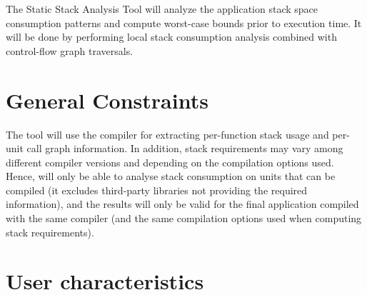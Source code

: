 The Static Stack Analysis Tool will analyze the application stack
space consumption patterns and compute worst-case bounds prior to
execution time. It will be done by performing local stack consumption
analysis combined with control-flow graph traversals.

\section{General Constraints}

The tool will use the compiler for extracting per-function stack usage
and per-unit call graph information. In addition, stack requirements
may vary among different compiler versions and depending on the
compilation options used. Hence, \ssat{} will only be able to
analyse stack consumption on units that can be compiled (it excludes
third-party libraries not providing the required information), and the
results will only be valid for the final application compiled with the
same compiler (and the same compilation options used when computing
stack requirements).

\section{User characteristics}

